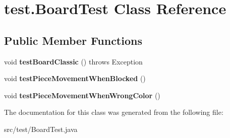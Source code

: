 \hypertarget{classtest_1_1_board_test}{\section{test.\-Board\-Test Class Reference}
\label{classtest_1_1_board_test}
}
\subsection*{Public Member Functions}
\begin{DoxyCompactItemize}
\item 
\hypertarget{classtest_1_1_board_test_ab34e21f215b8f4f3789e9533ba939a61}{void {\bfseries test\-Board\-Classic} ()  throws Exception }\label{classtest_1_1_board_test_ab34e21f215b8f4f3789e9533ba939a61}

\item 
\hypertarget{classtest_1_1_board_test_a4cfee6a77257f3f693a758201d4b4585}{void {\bfseries test\-Piece\-Movement\-When\-Blocked} ()}\label{classtest_1_1_board_test_a4cfee6a77257f3f693a758201d4b4585}

\item 
\hypertarget{classtest_1_1_board_test_a5556f974d1e968221a4cc965e2bf6476}{void {\bfseries test\-Piece\-Movement\-When\-Wrong\-Color} ()}\label{classtest_1_1_board_test_a5556f974d1e968221a4cc965e2bf6476}

\end{DoxyCompactItemize}


The documentation for this class was generated from the following file\-:\begin{DoxyCompactItemize}
\item 
src/test/Board\-Test.\-java\end{DoxyCompactItemize}
